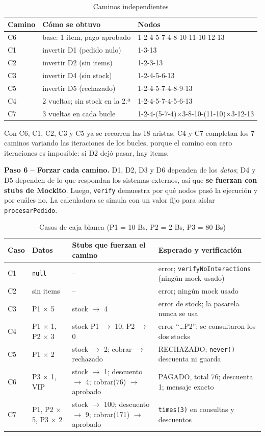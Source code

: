 \documentclass[11pt,a4paper,oneside]{report}
\newcommand{\code}[1]{\texttt{#1}}
\begin{document}
\begin{table}[H]
\centering
\caption{Caminos independientes}
\small
\begin{tabular}{lll}
\toprule
\textbf{Camino} & \textbf{Cómo se obtuvo} & \textbf{Nodos}\\
\midrule
C6 & base: 1 item, pago aprobado & 1-2-4-5-7-4-8-10-11-10-12-13\\
C1 & invertir D1 (pedido nulo) & 1-3-13\\
C2 & invertir D2 (sin items) & 1-2-3-13\\
C3 & invertir D4 (sin stock) & 1-2-4-5-6-13\\
C5 & invertir D5 (rechazado) & 1-2-4-5-7-4-8-9-13\\
C4 & 2 vueltas; sin stock en la 2.ª & 1-2-4-5-7-4-5-6-13\\
C7 & 3 vueltas en cada bucle & 1-2-4-(5-7-4)$\times$3-8-10-(11-10)$\times$3-12-13\\
\bottomrule
\end{tabular}
\end{table}
Con C6, C1, C2, C3 y C5 ya se recorren las 18 aristas. C4 y C7 completan los 7 caminos variando las iteraciones de los bucles, porque el camino con cero iteraciones es imposible: si D2 dejó pasar, hay items.

\textbf{Paso 6 -- Forzar cada camino.} D1, D2, D3 y D6 dependen de los \emph{datos}; D4 y D5 dependen de lo que respondan los sistemas externos, así que \textbf{se fuerzan con stubs de Mockito}. Luego, \code{verify} demuestra por qué nodos pasó la ejecución y por cuáles no. La calculadora se simula con un valor fijo para aislar \code{procesarPedido}.

\begin{table}[H]
\centering
\caption{Casos de caja blanca (P1 = 10 Bs, P2 = 2 Bs, P3 = 80 Bs)}
\scriptsize
\begin{tabularx}{\linewidth}{lllX}
\toprule
\textbf{Caso} & \textbf{Datos} & \textbf{Stubs que fuerzan el camino} & \textbf{Esperado y verificación}\\
\midrule
C1 & \code{null} & -- & error; \code{verifyNoInteractions} (ningún mock usado)\\
C2 & sin items & -- & error; ningún mock usado\\
C3 & P1 $\times$ 5 & stock $\rightarrow$ 4 & error de stock; la pasarela nunca se usa\\
C4 & P1 $\times$ 1, P2 $\times$ 3 & stock P1 $\rightarrow$ 10, P2 $\rightarrow$ 0 & error ``\ldots P2''; se consultaron los dos stocks\\
C5 & P1 $\times$ 2 & stock $\rightarrow$ 2; cobrar $\rightarrow$ rechazado & RECHAZADO; \code{never()} descuenta ni guarda\\
C6 & P3 $\times$ 1, VIP & stock $\rightarrow$ 1; descuento $\rightarrow$ 4; cobrar(76) $\rightarrow$ aprobado & PAGADO, total 76; descuenta 1; mensaje exacto\\
C7 & P1, P2 $\times$ 5, P3 $\times$ 2 & stock $\rightarrow$ 100; descuento $\rightarrow$ 9; cobrar(171) $\rightarrow$ aprobado & \code{times(3)} en consultas y descuentos\\
\bottomrule
\end{tabularx}
\end{table}
\end{document}
